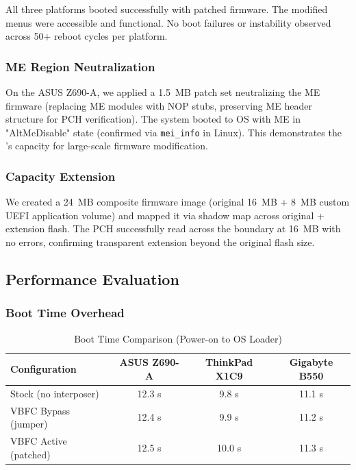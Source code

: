 All three platforms booted successfully with patched firmware. The modified menus were accessible and functional. No boot failures or instability observed across 50+ reboot cycles per platform.

\subsubsection{ME Region Neutralization}
On the ASUS Z690-A, we applied a \SI{1.5}{MB} patch set neutralizing the \ac{ME} firmware (replacing \ac{ME} modules with NOP stubs, preserving \ac{ME} header structure for \ac{PCH} verification). The system booted to OS with \ac{ME} in "AltMeDisable" state (confirmed via \texttt{mei\_info} in Linux). This demonstrates the \vbfc's capacity for large-scale firmware modification.

\subsubsection{Capacity Extension}
We created a \SI{24}{MB} composite firmware image (original \SI{16}{MB} + \SI{8}{MB} custom \ac{UEFI} application volume) and mapped it via shadow map across original + extension flash. The \ac{PCH} successfully read across the boundary at \SI{16}{MB} with no errors, confirming transparent extension beyond the original flash size.

\subsection{Performance Evaluation}

\subsubsection{Boot Time Overhead}
\begin{table}[h]
\centering
\caption{Boot Time Comparison (Power-on to OS Loader)}
\label{tab:boot_time}
\begin{tabular}{@{}lccc@{}}
\toprule
\textbf{Configuration} & \textbf{ASUS Z690-A} & \textbf{ThinkPad X1C9} & \textbf{Gigabyte B550} \\
\midrule
Stock (no interposer) & 12.3 s & 9.8 s & 11.1 s \\
VBFC Bypass (jumper)  & 12.4 s & 9.9 s & 11.2 s \\
VBFC Active (patched) & 12.5 s & 10.0 s & 11.3 s \\
\bottomrule
\end{tabular}
\end{table}

